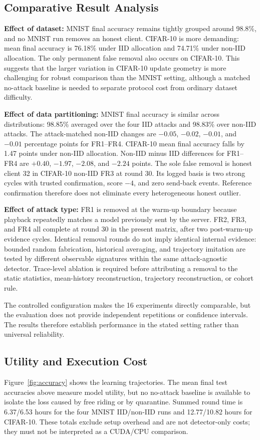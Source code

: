 \documentclass[conference]{IEEEtran}
\begin{document}
\subsection{Comparative Result Analysis}
\textbf{Effect of dataset:}
MNIST final accuracy remains tightly grouped around 98.8\%, and no MNIST run removes an honest client. CIFAR-10 is more demanding: mean final accuracy is 76.18\% under IID allocation and 74.71\% under non-IID allocation. The only permanent false removal also occurs on CIFAR-10. This suggests that the larger variation in CIFAR-10 update geometry is more challenging for robust comparison than the MNIST setting, although a matched no-attack baseline is needed to separate protocol cost from ordinary dataset difficulty.

\textbf{Effect of data partitioning:}
MNIST final accuracy is similar across distributions: 98.85\% averaged over the four IID attacks and 98.83\% over non-IID attacks. The attack-matched non-IID changes are $-0.05$, $-0.02$, $-0.01$, and $-0.01$ percentage points for FR1--FR4. CIFAR-10 mean final accuracy falls by 1.47 points under non-IID allocation. Non-IID minus IID differences for FR1--FR4 are $+0.40$, $-1.97$, $-2.08$, and $-2.24$ points. The sole false removal is honest client 32 in CIFAR-10 non-IID FR3 at round 30. Its logged basis is two strong cycles with trusted confirmation, score $-4$, and zero send-back events. Reference confirmation therefore does not eliminate every heterogeneous honest outlier.

\textbf{Effect of attack type:}
FR1 is removed at the warm-up boundary because playback repeatedly matches a model previously sent by the server. FR2, FR3, and FR4 all complete at round 30 in the present matrix, after two post-warm-up evidence cycles. Identical removal rounds do not imply identical internal evidence: bounded random fabrication, historical averaging, and trajectory imitation are tested by different observable signatures within the same attack-agnostic detector. Trace-level ablation is required before attributing a removal to the static statistics, mean-history reconstruction, trajectory reconstruction, or cohort rule.

The controlled configuration makes the 16 experiments directly comparable, but the evaluation does not provide independent repetitions or confidence intervals. The results therefore establish performance in the stated setting rather than universal reliability.

\subsection{Utility and Execution Cost}
Figure~\ref{fig:accuracy} shows the learning trajectories. The mean final test accuracies above measure model utility, but no no-attack baseline is available to isolate the loss caused by free riding or by quarantine. Summed round time is 6.37/6.53 hours for the four MNIST IID/non-IID runs and 12.77/10.82 hours for CIFAR-10. These totals exclude setup overhead and are not detector-only costs; they must not be interpreted as a CUDA/CPU comparison.
\end{document}
